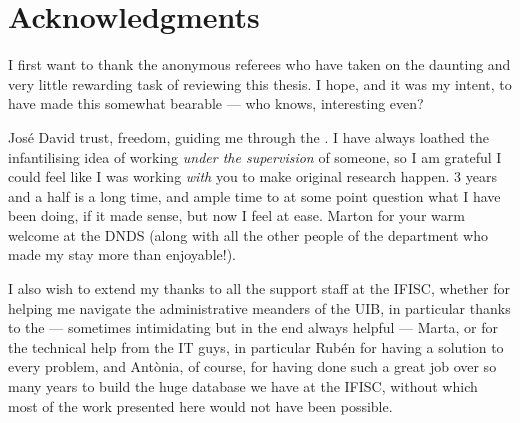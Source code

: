 \documentclass[../thesis.tex]{subfiles}
\begin{document}

\begingroup
\let\clearpage\relax
\let\cleardoublepage\relax
\let\cleardoublepage\relax
\chapter*{Acknowledgments}

I first want to thank the anonymous referees who have taken on the daunting and very little rewarding task of reviewing this thesis.
I hope, and it was my intent, to have made this somewhat bearable --- who knows, interesting even?

José David
trust, freedom, guiding me through the .
I have always loathed the infantilising idea of working \emph{under the supervision} of someone, so I am grateful I could feel like I was working \emph{with} you to make original research happen.
3 years and a half is a long time, and ample time to at some point question what I have been doing, if it made sense, but now I feel at ease.
Marton for your warm welcome at the DNDS (along with all the other people of the department who made my stay more than enjoyable!).

I also wish to extend my thanks to all the support staff at the IFISC, whether for helping me navigate the administrative meanders of the UIB, in particular thanks to the --- sometimes intimidating  but in the end always helpful --- Marta, or for the technical help from the IT guys, in particular Rubén for having a solution to every problem, and Antònia, of course, for having done such a great job over so many years to build the huge database we have at the IFISC, without which most of the work presented here would not have been possible.


\endgroup
\end{document}
